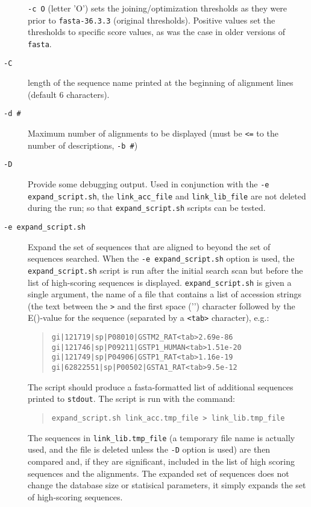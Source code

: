 \documentclass[11pt]{article}
\begin{document}
\begin{description}
\texttt{-c O} (letter 'O') sets the joining/optimization
thresholds as they were prior to \texttt{fasta-36.3.3} (original thresholds). Positive
values set the thresholds to specific score values, as was the case
in older versions of \texttt{fasta}.

\item[\texttt{-C}]
length of the sequence name printed at the beginning of alignment
lines (default 6 characters).
\item[\texttt{-d \#}]
Maximum number of alignments to be displayed (must be \texttt{<=} to the number of descriptions, \texttt{-b \#})
\item[\texttt{-D}]
  Provide some debugging output.  Used in conjunction
  with the \texttt{-e expand\_script.sh}, the \texttt{link\_acc\_file}
  and \texttt{link\_lib\_file} are not deleted during the run; so that
  \texttt{expand\_script.sh} scripts can be tested.

\item[\texttt{-e expand\_script.sh}]

  Expand the set of sequences that
  are aligned to beyond the set of sequences searched. When the
  \texttt{-e expand\_script.sh} option is used, the
  \texttt{expand\_script.sh} script is run after the initial search
  scan but before the list of high-scoring sequences is displayed.
  \texttt{expand\_script.sh} is given a single argument, the name of a
  file that contains a list of accession strings (the text between the
  \texttt{>} and the first space ('\textvisiblespace') character
  followed by the E()-value for the sequence (separated by a
  \texttt{<tab>} character), e.g.:
\begin{quote}
\begin{verbatim}
gi|121719|sp|P08010|GSTM2_RAT<tab>2.69e-86
gi|121746|sp|P09211|GSTP1_HUMAN<tab>1.51e-20
gi|121749|sp|P04906|GSTP1_RAT<tab>1.16e-19
gi|62822551|sp|P00502|GSTA1_RAT<tab>9.5e-12
\end{verbatim}
\end{quote}
The script should produce a fasta-formatted list of additional
sequences printed to \texttt{stdout}.  The script is run with the command:
\begin{quote}
\begin{verbatim}
expand_script.sh link_acc.tmp_file > link_lib.tmp_file
\end{verbatim}
\end{quote}
The sequences in \texttt{link\_lib.tmp\_file} (a temporary file name is
actually used, and the file is deleted unless the \texttt{-D} option
is used) are then compared and, if they are significant, included in
the list of high scoring sequences and the alignments.  The expanded
set of sequences does not change the database size or statisical
parameters, it simply expands the set of high-scoring sequences.


\end{description}
\end{document}
